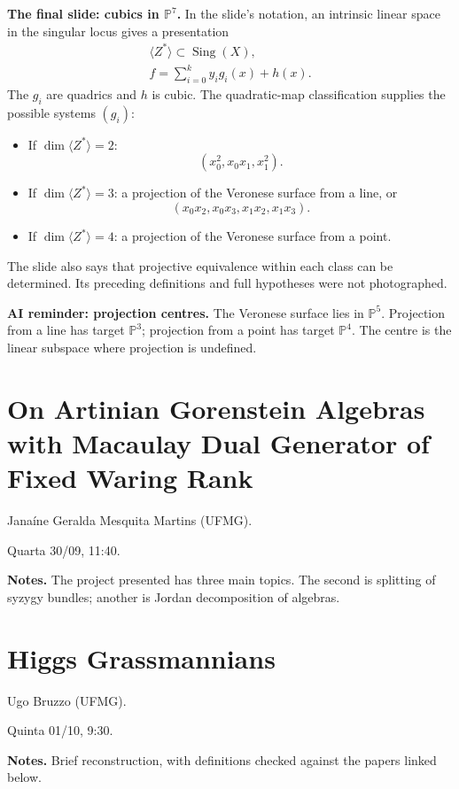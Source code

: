 \medskip\noindent
\textbf{The final slide: cubics in
$\mathbb{P}^7$.}
In the slide's notation, an intrinsic
linear space in the singular locus gives
a presentation
$$
\begin{gathered}
\langle Z^*\rangle
\subset\operatorname{Sing}(X),\\
f=\sum_{i=0}^{k}y_i g_i(x)+h(x).
\end{gathered}
$$
The $g_i$ are quadrics and $h$ is cubic.
The quadratic-map classification supplies
the possible systems $(g_i)$:
\begin{itemize}
\item If $\dim\langle Z^*\rangle=2$:
$$
(x_0^2,x_0x_1,x_1^2).
$$
\item If $\dim\langle Z^*\rangle=3$:
a projection of the Veronese surface
from a line, or
$$
(x_0x_2,x_0x_3,x_1x_2,x_1x_3).
$$
\item If $\dim\langle Z^*\rangle=4$:
a projection of the Veronese surface
from a point.
\end{itemize}
The slide also says that projective
equivalence within each class can be
determined. Its preceding definitions
and full hypotheses were not photographed.

\medskip\noindent
\textbf{AI reminder: projection centres.}
The Veronese surface lies in
$\mathbb{P}^5$. Projection from a line
has target $\mathbb{P}^3$; projection
from a point has target $\mathbb{P}^4$.
The centre is the linear subspace where
projection is undefined.

\section{On Artinian Gorenstein Algebras with
Macaulay Dual Generator of Fixed Waring
Rank}
\label{section-janaine-martins}

Janaíne Geralda Mesquita Martins (UFMG).

Quarta 30/09, 11:40.

\medskip\noindent
\textbf{Notes.}
The project presented has three main
topics. The second is splitting of
syzygy bundles; another is Jordan
decomposition of algebras.

\section{Higgs Grassmannians}
\label{section-ugo-bruzzo}

Ugo Bruzzo (UFMG).

Quinta 01/10, 9:30.

\medskip\noindent
\textbf{Notes.}
Brief reconstruction, with definitions
checked against the papers linked below.

